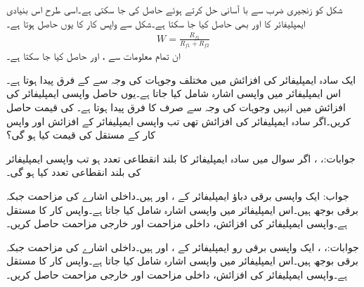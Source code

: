 شکل  کو زنجیری ضرب سے با آسانی حل کرتے ہوئے  حاصل کی جا سکتی ہے۔اسی  طرح اس بنیادی ایمپلیفائر کا  اور  بھی حاصل کیا جا سکتا ہے۔شکل سے واپس کار کا  یوں حاصل ہوتا ہے۔
\begin{align}\label{مساوات_واپسی_زنجیری_ایمپلیفائر}
W=\frac{R_{f1}}{R_{f1}+R_{f2}}
\end{align}
ان تمام معلومات سے ،  اور  حاصل کیا جا سکتا ہے۔

\newpage
{}

ایک سادہ ایمپلیفائر کی افزائش میں مختلف وجوہات کی وجہ سے   کے فرق پیدا ہوتا ہے۔اس ایمپلیفائر میں واپسی اشارہ شامل کیا جاتا ہے۔یوں حاصل واپسی ایمپلیفائر کی افزائش میں انہیں وجوہات کی وجہ سے  صرف  کا فرق پیدا ہوتا ہے۔ کی قیمت حاصل کریں۔اگر سادہ ایمپلیفائر کی افزائش  تھی تب واپسی ایمپلیفائر کے افزائش اور واپس کار کے مستقل   کی قیمت کیا ہو گی؟

جوابات:، ، 
اگر سوال  میں سادہ ایمپلیفائر کا بلند انقطاعی تعدد  ہو تب واپسی ایمپلیفائر کی بلند انقطاعی تعدد کیا ہو گی۔

جواب:
ایک واپسی برقی دباؤ ایمپلیفائر کے ،  اور  ہیں۔داخلی اشارے کی مزاحمت  جبکہ برقی بوجھ  ہیں۔اس ایمپلیفائر میں واپسی اشارہ شامل کیا جاتا ہے۔واپس کار کا مستقل  ہے۔واپسی ایمپلیفائر کی افزائش، داخلی مزاحمت اور خارجی مزاحمت حاصل کریں۔

جوابات:، ،   
ایک واپسی برقی رو ایمپلیفائر کے ،  اور
  ہیں۔داخلی اشارے کی مزاحمت  جبکہ برقی بوجھ  ہیں۔اس ایمپلیفائر میں واپسی اشارہ شامل کیا جاتا ہے۔واپس کار کا مستقل  ہے۔واپسی ایمپلیفائر کی افزائش، داخلی مزاحمت اور خارجی مزاحمت حاصل کریں۔

